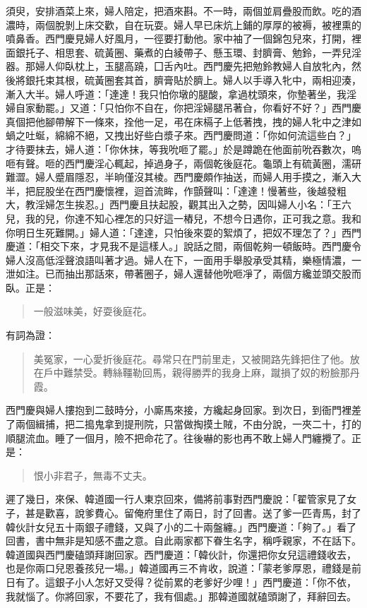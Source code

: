 須臾，安排酒菜上來，婦人陪定，把酒來斟。不一時，兩個並肩疊股而飲。吃的酒濃時，兩個脫剝上床交歡，自在玩耍。婦人早已床炕上鋪的厚厚的被褥，被裡熏的噴鼻香。西門慶見婦人好風月，一徑要打動他。家中袖了一個錦包兒來，打開，裡面銀托子、相思套、硫黃圈、藥煮的白綾帶子、懸玉環、封臍膏、勉鈴，一弄兒淫器。那婦人仰臥枕上，玉腿高蹺，囗舌內吐。西門慶先把勉鈴教婦人自放牝內，然後將銀托束其根，硫黃圈套其首，臍膏貼於臍上。婦人以手導入牝中，兩相迎湊，漸入大半。婦人呼道：「達達！我只怕你墩的腿酸，拿過枕頭來，你墊著坐，我淫婦自家動罷。」又道：「只怕你不自在，你把淫婦腿吊著㒲，你看好不好？」西門慶真個把他腳帶解下一條來，拴他一足，弔在床槅子上低著拽，拽的婦人牝中之津如蝸之吐蜒，綿綿不絕，又拽出好些白漿子來。西門慶問道：「你如何流這些白？」才待要抹去，婦人道：「你休抹，等我吮咂了罷。」於是蹲跪在他面前吮吞數次，嗚咂有聲。咂的西門慶淫心輒起，掉過身子，兩個乾後庭花。龜頭上有硫黃圈，濡研難澀。婦人蹙眉隱忍，半晌僅沒其棱。西門慶頗作抽送，而婦人用手摸之，漸入大半，把屁股坐在西門慶懷裡，迴首流眸，作顫聲叫：「達達！慢著些，後越發粗大，教淫婦怎生挨忍。」西門慶且扶起股，觀其出入之勢，因叫婦人小名：「王六兒，我的兒，你達不知心裡怎的只好這一樁兒，不想今日遇你，正可我之意。我和你明日生死難開。」婦人道：「達達，只怕後來耍的絮煩了，把奴不理怎了？」西門慶道：「相交下來，才見我不是這樣人。」說話之間，兩個乾夠一頓飯時。西門慶令婦人沒高低淫聲浪語叫著才過。婦人在下，一面用手舉股承受其精，樂極情濃，一泄如注。已而抽出那話來，帶著圈子，婦人還替他吮咂凈了，兩個方纔並頭交股而臥。正是：
\begin{quote}
一般滋味美，好耍後庭花。
\end{quote}
有詞為證：
\begin{quote}
美冤家，一心愛折後庭花。尋常只在門前里走，又被開路先鋒把住了他。放在戶中難禁受。轉絲韁勒回馬，親得勝弄的我身上麻，蹴損了奴的粉臉那丹霞。
\end{quote}

西門慶與婦人摟抱到二鼓時分，小廝馬來接，方纔起身回家。到次日，到衙門裡差了兩個緝捕，把二搗鬼拿到提刑院，只當做掏摸土賊，不由分說，一夾二十，打的順腿流血。睡了一個月，險不把命花了。往後嚇的影也再不敢上婦人門纏攪了。正是：
\begin{quote}
恨小非君子，無毒不丈夫。
\end{quote}

遲了幾日，來保、韓道國一行人東京回來，備將前事對西門慶說：「翟管家見了女子，甚是歡喜，說爹費心。留俺府里住了兩日，討了回書。送了爹一匹青馬，封了韓伙計女兒五十兩銀子禮錢，又與了小的二十兩盤纏。」西門慶道：「夠了。」看了回書，書中無非是知感不盡之意。自此兩家都下眷生名字，稱呼親家，不在話下。韓道國與西門慶磕頭拜謝回家。西門慶道：「韓伙計，你還把你女兒這禮錢收去，也是你兩口兒恩養孩兒一場。」韓道國再三不肯收，說道：「蒙老爹厚恩，禮錢是前日有了。這銀子小人怎好又受得？從前累的老爹好少哩！」西門慶道：「你不依，我就惱了。你將回家，不要花了，我有個處。」那韓道國就磕頭謝了，拜辭回去。

